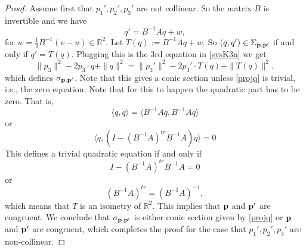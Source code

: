 \documentclass[letterpaper, reqno,11pt]{article}
\newcommand{\RR}{\mathbb{R}}
\newcommand{\p}{{\bf p}}
\theoremstyle{definition}
\theoremstyle{remark}
\begin{document}
\begin{proof}
Assume first that $p_1',p_2',p_3'$ are not collinear. So the matrix $B$ is invertible and we have 
$$
q'=B^{-1}Aq+w,
$$
for $w = \frac12 B^{-1}(v-u) \in\RR^2$. Let $T(q):=B^{-1}Aq+w$. 
So $(q,q')\in \Sigma_{\p,\p'}$ if and only if $q'=T(q)$. Plugging this is the 3rd equation in \eqref{sysK3n} we get
\begin{equation}\label{projq}
\|p_3\|^2-2p_3\cdot q+\|q\|^2=\|p_3'\|^2-2p_3'\cdot T(q)+\|T(q)\|^2,
\end{equation}
which defines $\sigma_{\p,\p'}$. Note that this gives a conic section unless \eqref{projq} is trivial, i.e., the zero equation. 
Note that for this to happen the quadratic part has to be zero. That is, 
$$
\langle q,q\rangle =\langle B^{-1}Aq,B^{-1}A q\rangle 
$$
or
$$
\langle q,\left(I-(B^{-1}A)^{tr}B^{-1}A\right)q\rangle =0
$$
This defines a trivial quadratic equation if and only if 
$$
I-(B^{-1}A)^{tr}B^{-1}A=0
$$
or
$$
(B^{-1}A)^{tr}=(B^{-1}A)^{-1},
$$
which means that $T$ is an isometry of $\RR^2$. 
This implies that $\p$ and $\p'$ are congruent.
We conclude that $\sigma_{\p,\p'}$ is either conic section given by  \eqref{projq} or $\p$ and $\p'$ are congruent, which completes the proof for the case that $p_1',p_2',p_3'$ are non-collinear. 


\end{proof}
\end{document}
